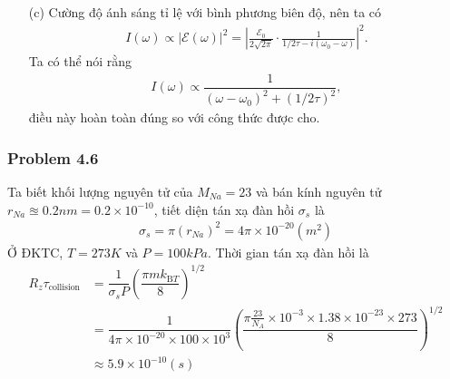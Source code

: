 \documentclass{report}
\newcommand{\f}[2]{\dfrac{#1}{#2}}
\begin{document}
\begin{enumerate}
	      \begin{align}
		      \mathcal{E}(\omega)
		       & = \f{1}{\sqrt{2}} \int_{0}^{+\infty} \left( \f{\mathcal{E}_0}{2} e^{i(\omega_0 - \omega)t - t/2\tau} + \f{\mathcal{E}_0}{2} e^{-i(\omega_0 + \omega)t - t/2\tau} \right) dt \nonumber \\
		       & = \frac{\mathcal{E}_0}{2\sqrt{2\pi}} \left( \frac{1}{1/2\tau - i(\omega_0 - \omega)} + \frac{1}{1/2\tau + i(\omega_0 + \omega)} \right).
	      \end{align}
	      Giả sử rằng $\omega_0 \gg 1/\tau$,
	      \begin{align*}
		      \mathcal{E}(\omega) \approx \frac{\mathcal{E}_0}{2\sqrt{2\pi}} \cdot \frac{1}{1/2\tau - i(\omega_0 - \omega)}.
	      \end{align*}(ĐPCM)
	\item[(c)]  Cường độ ánh sáng tỉ lệ với bình phương biên độ, nên ta có
	      \begin{align}
		      I(\omega) \propto |\mathcal{E}(\omega)|^2 = \left|\frac{\mathcal{E}_0}{2\sqrt{2\pi}} \cdot \frac{1}{1/2\tau - i(\omega_0 - \omega)}\right|^2.
	      \end{align}
	      Ta có thể nói rằng
	      \begin{align}
		      I(\omega) \propto \f{1}{(\omega - \omega_0)^2 + (1/2\tau)^2},
	      \end{align}
	      điều này hoàn toàn đúng so với công thức được cho.
\end{enumerate}
\subsubsection*{Problem 4.6}
Ta biết khối lượng nguyên tử của $M_{Na} = 23$ và bán kính nguyên tử $r_{Na} \approxeq 0.2nm = 0.2\times 10^{-10}$, tiết diện tán xạ đàn hồi $\sigma_s$ là
\begin{align}
	\sigma_s = \pi (r_{Na})^2 = 4\pi \times 10^{-20} (m^2)
\end{align}
Ở ĐKTC, $T = 273 K$ và $P = 100k Pa$. Thời gian tán xạ đàn hồi là
\begin{align*}
	R_z
	\tau_{\text{collision}}
	 & = \f{1}{\sigma_s P} \left( \f{\pi m k_{\text{B} T}}{8} \right)^{1/2}                                                                                       \\
	 & = \f{1}{4\pi \times 10^{-20 } \times 100\times10^{3}} \left( \f{\pi \frac{23}{N_A} \times 10^{-3} \times 1.38\times 10^{-23} \times 273 }{8} \right)^{1/2} \\
	 & \approx 5.9 \times 10^{-10} (s)
\end{align*}
\end{document}
